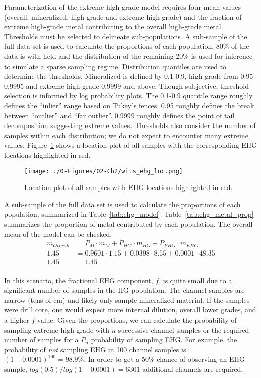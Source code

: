 Parameterization of the extreme high-grade model requires four mean values (overall, mineralized, high grade and extreme high grade) and the fraction of extreme high-grade metal contributing to the overall high-grade metal. Thresholds must be selected to delineate sub-populations. A sub-sample of the full data set is used to calculate the proportions of each population. 80\% of the data is with held and the distribution of the remaining 20\% is used for inference to simulate a sparse sampling regime. Distribution quantiles are used to determine the thresholds. Mineralized is defined by 0.1-0.9, high grade from 0.95-0.9995 and extreme high grade 0.9999 and above. Though subjective, threshold selection is informed by log probability plots. The 0.1-0.9 quantile range roughly defines the ``inlier'' range based on Tukey's fences. 0.95 roughly defines the break between ``outlier'' and ``far outlier''. 0.9999 roughly defines the point of tail decomposition suggesting extreme values. Thresholds also consider the number of samples within each distribution; we do not expect to encounter many extreme values. Figure~\ref{fig:wits_ehg_loc} shows a location plot of all samples with the corresponding EHG locations highlighted in red.

\begin{figure}[htb!]
    \centering
    \texttt{[image: ./0-Figures/02-Ch2/wits\_ehg\_loc.png]}
    \caption{Location plot of all samples with EHG locations highlighted in red.}
    \label{fig:wits_ehg_loc}
\end{figure}

A sub-sample of the full data set is used to calculate the proportions of each population, summarized in Table~\ref{tab:ehg_model}. Table~\ref{tab:ehg_metal_prop} summarizes the proportion of metal contributed by each population. The overall mean of the model can be checked:
\begin{align*}
    m_{Overall} & = P_{M} \cdot m_{M}  + P_{HG} \cdot m_{HG} + P_{EHG} \cdot m_{EHG} \\
    1.45        & = 0.9601 \cdot 1.15 + 0.0398 \cdot 8.55 + 0.0001 \cdot 48.35       \\
    1.45        & = 1.45                                                             \\
\end{align*}



In this scenario, the fractional EHG component, $f$, is quite small due to a significant number of samples in the HG population. The channel samples are narrow (tens of cm) and likely only sample mineralized material. If the samples were drill core, one would expect more internal dilution, overall lower grades, and a higher $f$ value. Given the proportions, we can calculate the probability of sampling extreme high grade with $n$ successive channel samples or the required number of samples for a $P_n$ probability of sampling EHG. For example, the probability of \emph{not} sampling EHG in 100 channel samples is $(1-0.0001)^{100} = 98.9\%$. In order to get a 50\% chance of observing an EHG sample, $log(0.5)/log(1-0.0001) = 6301$ additional channels are required.

